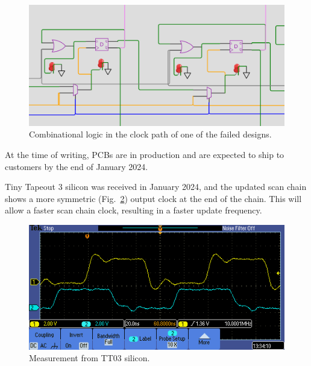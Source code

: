 \begin{figure}[!t]
\centering
\includegraphics[width=\columnwidth]{./Figs/wokwi mux clock logic.png}
\caption{Combinational logic in the clock path of one of the failed designs.}
\label{fig:failed_design_comb_logic}
\end{figure}

At the time of writing, PCBs are in production and are expected to ship to customers by the end of January 2024.

Tiny Tapeout 3 silicon was received in January 2024, and the updated scan chain shows a more symmetric (Fig.~\ref{fig:TT03_silicon_measurement}) output clock at the end of the chain. This will allow a faster scan chain clock, resulting in a faster update frequency.

\begin{figure}[!t]
\centering
\includegraphics[width=\columnwidth]{./Figs/tt03_clock_out.png}
\caption{Measurement from TT03 silicon.}
\label{fig:TT03_silicon_measurement}
\end{figure}

